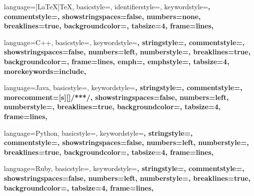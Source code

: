\makeatletter
{}
\makeatother
\setlength{\parindent}{1.3cm}
\setlength{\parskip}{0.2cm}
\makeindex

 {
  language={[LaTeX]TeX},
  basicstyle=\ttfamily\small,
  identifierstyle=\color{black},
  keywordstyle=\color{blue}\bfseries,
  commentstyle=\color{comentary},
  showstringspaces=false,
  numbers=none,
  breaklines=true,
  backgroundcolor=\color{white},
  tabsize=4,
  frame=lines,
}

 {
  language=C++,
  basicstyle=\ttfamily\small,
  keywordstyle=\color{blue}\bfseries,
  stringstyle=\color{string},
  commentstyle=\color{comentary},
  showstringspaces=false,
  numbers=left,
  numberstyle=\tiny,
  breaklines=true,
  backgroundcolor=\color{white},
  frame=lines,
  emph={},
  emphstyle={\color{blue}\bfseries},
  tabsize=4,
  morekeywords={include},
}

 {
  language=Java,
  basicstyle=\ttfamily\small,
  keywordstyle=\color{blue}\bfseries,
  stringstyle=\color{string},
  commentstyle=\color{comentary},
  morecomment=[s][\color{blue}]{/**}{*/},
  showstringspaces=false,
  numbers=left,
  numberstyle=\tiny,
  breaklines=true,
  backgroundcolor=\color{white},
  tabsize=4,
  frame=lines,
}

 {
  language=Python,
  basicstyle=\ttfamily\small,
  keywordstyle=\color{blue}\bfseries,
  stringstyle=\color{string},
  commentstyle=\color{comentary},
  showstringspaces=false,
  numbers=left,
  numberstyle=\tiny,
  breaklines=true,
  backgroundcolor=\color{white},
  tabsize=4,
  frame=lines,
}

 {
  language=Ruby,
  basicstyle=\ttfamily\small,
  keywordstyle=\color{blue}\bfseries,
  stringstyle=\color{string},
  commentstyle=\color{comentary},
  showstringspaces=false,
  numbers=left,
  numberstyle=\tiny,
  breaklines=true,
  backgroundcolor=\color{white},
  tabsize=4,
  frame=lines,
}

